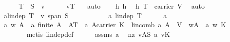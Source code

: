 \begin{isabellebody}
\isadelimproof
%
\endisadelimproof
%
\isatagproof
{}\isamarkupfalse%
\ {\isacharminus}\isanewline
\ \ \isamarkupfalse%
\ {\isacharquery}T\ {\isacharequal}\ {\isachardoublequoteopen}S\ {\isasymunion}\ {\isacharbraceleft}v{\isacharbraceright}{\isachardoublequoteclose}\ \isanewline
\ \ \isamarkupfalse%
\ {}{\isacharcolon}\ {\isachardoublequoteopen}v{\isasymin}{\isacharquery}T\ {\isachardoublequoteclose}\ \isamarkupfalse%
\ auto\isanewline
\ \ \isamarkupfalse%
\ h{}\ h{}\ \isamarkupfalse%
\ h{}{\isacharunderscore}{}{\isacharcolon}\ {\isachardoublequoteopen}{\isacharquery}T\ {\isasymsubseteq}\ carrier\ V{\isachardoublequoteclose}\ \isamarkupfalse%
\ auto\isanewline
\ \ \isamarkupfalse%
\ a{}{\isacharcolon}{\isachardoublequoteopen}lin{\isacharunderscore}dep\ {\isacharquery}T\ {\isasymLongrightarrow}\ v{\isasymin}\ span\ S{\isachardoublequoteclose}\isanewline
\ \ \isamarkupfalse%
\ {\isacharminus}\ \isanewline
\ \ \ \ \isamarkupfalse%
\ a{}{}{\isacharcolon}\ {\isachardoublequoteopen}lin{\isacharunderscore}dep\ {\isacharquery}T{\isachardoublequoteclose}\isanewline
\ \ \ \ \isamarkupfalse%
\ a{}{}\ \isamarkupfalse%
\ a\ w\ A\ \ a{\isacharcolon}\ {\isachardoublequoteopen}{\isacharparenleft}finite\ A\ {\isasymand}\ A{\isasymsubseteq}{\isacharquery}T\ {\isasymand}\ {\isacharparenleft}a{\isasymin}\ {\isacharparenleft}A{\isasymrightarrow}carrier\ K{\isacharparenright}{\isacharparenright}\ {\isasymand}\ {\isacharparenleft}lincomb\ a\ A\ {\isacharequal}\ {\isasymzero}\isactrlbsub V\isactrlesub {\isacharparenright}\ {\isasymand}\ {\isacharparenleft}w{\isasymin}A{\isacharparenright}\ {\isasymand}\ {\isacharparenleft}a\ w{\isasymnoteq}\ {\isasymzero}\isactrlbsub K\isactrlesub {\isacharparenright}{\isacharparenright}{\isachardoublequoteclose}\isanewline
\ \ \ \ \ \ \isamarkupfalse%
\ {\isacharparenleft}metis\ lin{\isacharunderscore}dep{\isacharunderscore}def{\isacharparenright}\isanewline
\ \ \ \ \isamarkupfalse%
\ assms\ a\ \isamarkupfalse%
\ nz{}{\isacharcolon}\ {\isachardoublequoteopen}{\isasymexists}v{\isasymin}A{\isacharminus}S{\isachardot}\ a\ v{\isasymnoteq}{\isasymzero}\isactrlbsub K\isactrlesub {\isachardoublequoteclose}\ \isanewline
\ \ \ \ \ \ \isamarkupfalse%

\end{isabellebody}
